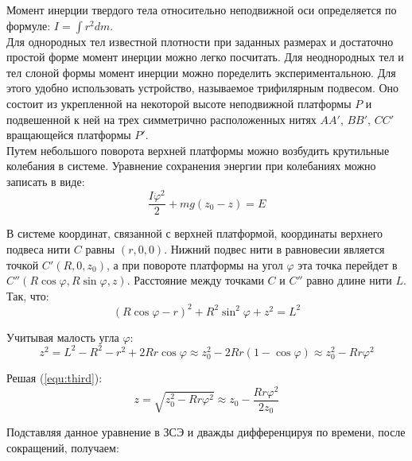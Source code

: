 \documentclass[12pt,a4paper]{article}
\begin{document}
	
	\begin{flushleft}
		\begin{spacing}{1.6}
		
Момент инерции твердого тела относительно неподвижной оси определяется по формуле: $ I = \int r^2 dm $.\\
Для однородных тел известной плотности при заданных размерах и достаточно простой форме момент инерции можно легко посчитать. Для неоднородных тел и тел слоной формы момент инерции можно поределить экспериментальною. Для этого удобно использовать устройство, называемое трифилярным подвесом. Оно состоит из укрепленной на некоторой высоте неподвижной платформы $P$ и подвешенной к ней на трех симметрично расположенных нитях $AA'$, $BB'$, $CC'$ вращающейся платформы $P'$.\\
Путем небольшого поворота верхней платформы можно возбудить крутильные колебания в системе. Уравнение сохранения энергии при колебаниях можно записать в виде:
\begin{equation}	
\frac{I\ddot{\varphi}^2}{2} + mg(z_{0} - z) = E
\label{equ:first}	
\end{equation}			
			
В системе координат, связанной с верхней платформой, координаты верхнего подвеса нити $C$ равны $(r, 0, 0)$. Нижний подвес нити в равновесии является точкой $C'(R, 0, z_{0})$, а при повороте платформы на угол $\varphi$ эта точка перейдет в $C''(R\cos\varphi, R\sin\varphi, z)$. Расстояние между точками $C$ и $C''$ равно длине нити $L$. Так, что:
\begin{equation}
(R\cos\varphi- r)^2 + R^2\sin^2\varphi + z^2 = L^2
\label{equ:second}	
\end{equation}

Учитывая малость угла $\varphi$:
\begin{equation}		
z^2 = L^2 - R^2 - r^2 + 2Rr\cos\varphi \approx z^2_{0} - 2Rr(1 - \cos\varphi) \approx z^2_{0} - Rr\varphi^2
\label{equ:third}	
\end{equation}

Решая (\ref{equ:third}):
\begin{equation}
z = \sqrt{z^2_{0} - Rr\varphi^2} \approx z_{0} - \frac{Rr\varphi^2}{2z_{0}}
\label{equ:fourth}	
\end{equation}
			
		\end{spacing}
	\end{flushleft}
	
		Подставляя данное уравнение в ЗСЭ и дважды дифференцируя по времени, после сокращений, получаем:
		
\end{document}
